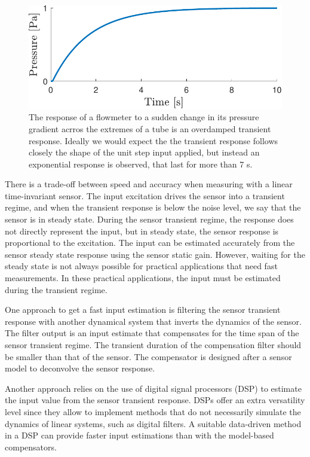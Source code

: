 \begin{figure}[!htbp]
\centering
\includegraphics[width=0.69\columnwidth]{./ChapterIntroduction/fig/Fig_5.pdf} 
\caption{ \label{fig:pressure} 
\color{blue} The response of a flowmeter to a sudden change in its pressure gradient acrros the extremes of a tube is an overdamped transient response. Ideally we would expect the the transient response follows closely the shape of the unit step input applied, but instead an exponential response is observed, that last for more than 7 s.  \color{black}  }
\end{figure}

\color{black}


There is a trade-off between speed and accuracy when measuring with a linear time-invariant sensor.
The input excitation drives the sensor into a transient regime, and when the transient response is below the noise level, we say that the sensor is in steady state.
During the sensor transient regime, the response does not directly represent the input, but 
in steady state, the sensor response is proportional to the excitation.
The input can be estimated accurately from the sensor steady state response using the sensor static gain.
However, waiting for the steady state is not always possible for practical applications that need fast measurements.
In these practical applications, the input must be estimated during the transient regime.

One approach to get a fast input estimation is filtering the sensor transient response with another dynamical system that inverts the dynamics of the sensor.
The filter output is an input estimate that compensates for the time span of the sensor transient regime.
The transient duration of the compensation filter should be smaller than that of the sensor.
The compensator is designed after a sensor model to deconvolve the sensor response.

Another approach relies on the use of digital signal processors (DSP) to estimate the input value from the sensor transient response.
DSPs offer an extra versatility level since they allow to implement methods that do not necessarily simulate the dynamics of linear systems, such as digital filters.
A suitable data-driven method in a DSP can provide faster input estimations than with the model-based compensators.

